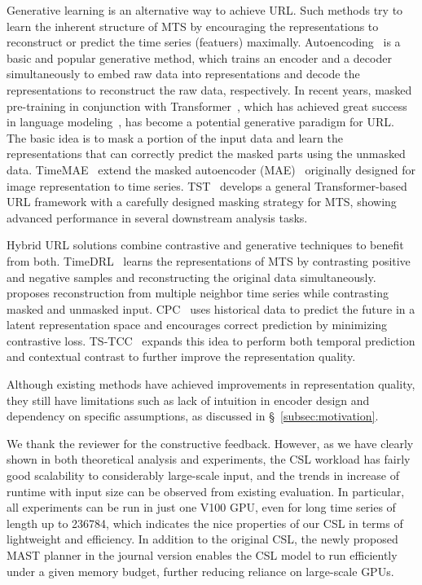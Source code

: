\begin{sloppypar}
\begin{framed}
Generative learning is an alternative way to achieve URL. Such methods try to learn the inherent structure of MTS by encouraging the representations to reconstruct or predict the time series (featuers) maximally. Autoencoding~\cite{baldi2012autoencoders} is a basic and popular generative method, which trains an encoder and a decoder simultaneously to embed raw data into representations and decode the representations to reconstruct the raw data, respectively. In recent years, masked pre-training in conjunction with Transformer~\cite{attention}, which has achieved great success in language modeling~\cite{kenton2019bert}, has become a potential generative paradigm for URL. The basic idea is to mask a portion of the input data and learn the representations that can correctly predict the masked parts using the unmasked data. TimeMAE~\cite{cheng2023timemae}  extend the masked autoencoder (MAE)~\cite{he2022masked-autoencoder} originally designed for image representation to time series. TST~\cite{TST} develops a general Transformer-based URL framework with a carefully designed masking strategy for MTS, showing advanced performance in several downstream analysis tasks.

Hybrid URL solutions combine contrastive and generative techniques to benefit from both. TimeDRL~\cite{chang2024timedrl} learns the representations of MTS by contrasting positive and negative samples and reconstructing the original data simultaneously.  proposes reconstruction from multiple neighbor time series while contrasting masked and unmasked input. CPC~\cite{CPC} uses historical data to predict the future in a latent representation space and encourages correct prediction by minimizing contrastive loss. TS-TCC~\cite{TS-TCC} expands this idea to perform both temporal prediction and contextual contrast to further improve the representation quality.

Although existing methods have achieved improvements in representation quality, they still have limitations such as lack of intuition in encoder design and dependency on specific assumptions, as discussed in \S~\ref{subsec:motivation}. 
\end{framed}


We thank the reviewer for the constructive feedback. However, as we have clearly shown in both theoretical analysis and experiments, the CSL workload has fairly good scalability to considerably large-scale input, and the trends in increase of runtime with input size can be observed from existing evaluation. In particular, all experiments can be run in just one V100 GPU, even for long time series of length up to 236784, which indicates the nice properties of our CSL in terms of lightweight and efficiency. In addition to the original CSL, the newly proposed MAST planner in the journal version enables the CSL model to run efficiently under a given memory budget, further reducing reliance on large-scale GPUs. 


\end{sloppypar}
